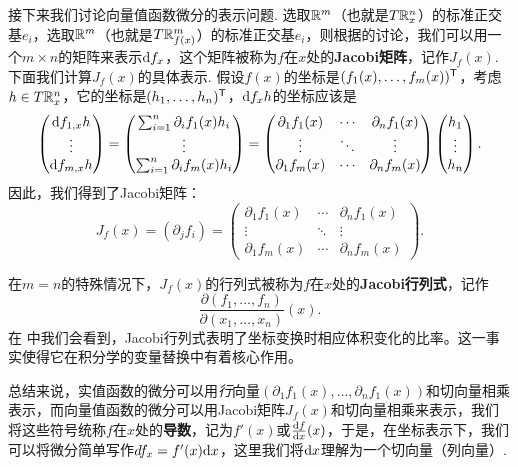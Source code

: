 接下来我们讨论向量值函数微分的表示问题. 选取$\mathbb{R}^m$（也就是$T\mathbb{R}_x^n$）的标准正交基$e_i$，选取$\mathbb{R}^m$（也就是$T\mathbb{R}^m_{f(x)}$）的标准正交基$e_i$，则根据的讨论，我们可以用一个$m\times n$的矩阵来表示$\mathrm{d} f_x$，这个矩阵被称为$f$在$x$处的\textbf{Jacobi矩阵}，记作$J_f(x)$. 下面我们计算$J_f(x)$的具体表示. 假设$f(x)$的坐标是$(f_1(x),\dots,f_m(x))^{\mathsf{T}}$，考虑$h\in T\mathbb{R}_x^n$，它的坐标是$(h_1,\dots,h_n)^{\mathsf{T}}$，$\mathrm{d} f_x h$的坐标应该是
\[\begin{pmatrix}
    \mathrm{d} f_{1,x}h \\
    \vdots \\
    \mathrm{d} f_{m,x}h
\end{pmatrix}=
\begin{pmatrix}
    \sum_{i=1}^n\partial_i f_1(x)h_i \\
    \vdots \\
    \sum_{i=1}^n\partial_i f_m(x)h_i
\end{pmatrix}=
\begin{pmatrix}
    \partial_1 f_1(x) & \cdots & \partial_n f_1(x) \\
    \vdots & \ddots & \vdots \\
    \partial_1 f_m(x) & \cdots & \partial_n f_m(x)
\end{pmatrix}
\begin{pmatrix}
    h_1 \\
    \vdots \\
    h_n
\end{pmatrix}.\]
因此，我们得到了Jacobi矩阵：
\[J_f(x)=(\partial_j f_i)=\begin{pmatrix}
    \partial_1 f_1(x) & \cdots & \partial_n f_1(x) \\
    \vdots & \ddots & \vdots \\
    \partial_1 f_m(x) & \cdots & \partial_n f_m(x)
\end{pmatrix}.\]

在$m=n$的特殊情况下，$J_f(x)$的行列式被称为$f$在$x$处的\textbf{Jacobi行列式}，记作
\[\frac{\partial(f_1,\dots,f_n)}{\partial(x_1,\dots,x_n)}(x).\]
在 中我们会看到，Jacobi行列式表明了坐标变换时相应体积变化的比率。这一事实使得它在积分学的变量替换中有着核心作用。

总结来说，实值函数的微分可以用\emph{行}向量$(\partial_1 f_1(x),\dots,\partial_n f_1(x))$和切向量相乘表示，而向量值函数的微分可以用Jacobi矩阵$J_f(x)$和切向量相乘来表示，我们将这些符号统称$f$在$x$处的\textbf{导数}，记为$f'(x)$或$\frac{\mathrm{d} f}{\mathrm{d} x}(x)$，于是，在坐标表示下，我们可以将微分简单写作$df_x=f'(x)\mathrm{d} x$，这里我们将$\mathrm{d} x$理解为一个切向量（列向量）. 

